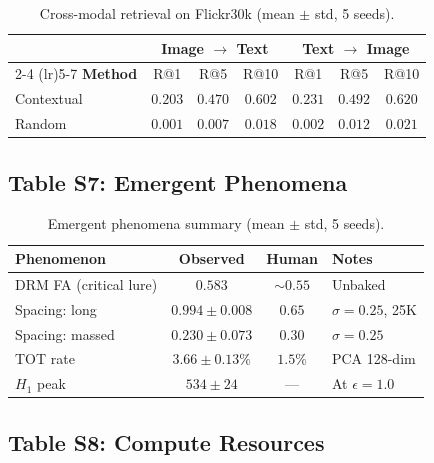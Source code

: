 \documentclass[11pt]{article}
\begin{document}
\begin{table}[!ht]
\centering
\caption{Cross-modal retrieval on Flickr30k (mean $\pm$ std, 5 seeds).}
\label{tab:phase4_full}
\small
\begin{tabular}{@{}lcccccc@{}}
\toprule
& \multicolumn{3}{c}{\textbf{Image $\to$ Text}} & \multicolumn{3}{c}{\textbf{Text $\to$ Image}} \\
\cmidrule(lr){2-4} \cmidrule(lr){5-7}
\textbf{Method} & R@1 & R@5 & R@10 & R@1 & R@5 & R@10 \\
\midrule
Contextual & $0.203$ & $0.470$ & $0.602$ & $0.231$ & $0.492$ & $0.620$ \\
Random & $0.001$ & $0.007$ & $0.018$ & $0.002$ & $0.012$ & $0.021$ \\
\bottomrule
\end{tabular}
\end{table}

\subsection*{Table S7: Emergent Phenomena}

\begin{table}[!ht]
\centering
\caption{Emergent phenomena summary (mean $\pm$ std, 5 seeds).}
\label{tab:phase5_full}
\small
\begin{tabular}{@{}lccl@{}}
\toprule
\textbf{Phenomenon} & \textbf{Observed} & \textbf{Human} & \textbf{Notes} \\
\midrule
DRM FA (critical lure) & $0.583$ & ${\sim}0.55$ & Unbaked \\
Spacing: long & $0.994 \pm 0.008$ & $0.65$ & $\sigma = 0.25$, 25K \\
Spacing: massed & $0.230 \pm 0.073$ & $0.30$ & $\sigma = 0.25$ \\
TOT rate & $3.66 \pm 0.13\%$ & $1.5\%$ & PCA 128-dim \\
$H_1$ peak & $534 \pm 24$ & --- & At $\epsilon = 1.0$ \\
\bottomrule
\end{tabular}
\end{table}

\subsection*{Table S8: Compute Resources}
\end{document}
